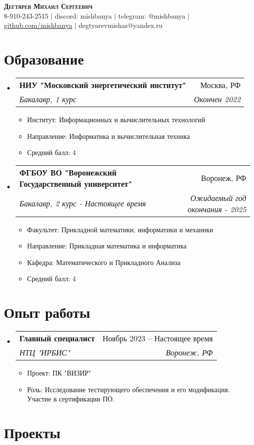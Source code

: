 \documentclass[letterpaper,11pt]{article}
\makeatletter
\newcommand{\resumeItem}[1]{
  \item\small{
    {#1 \vspace{-2pt}}
  }
}
\newcommand{\resumeSubheading}[4]{
  \vspace{-2pt}\item
    \begin{tabular*}{0.97\textwidth}[t]{l@{\extracolsep{\fill}}r}
      \textbf{#1} & #2 \\
      \textit{\small#3} & \textit{\small #4} \\
    \end{tabular*}\vspace{-7pt}
}
\newcommand{\resumeSubHeadingListStart}{\begin{itemize}[leftmargin=0.15in, label={}]}
\newcommand{\resumeSubHeadingListEnd}{\end{itemize}}
\newcommand{\resumeItemListStart}{\begin{itemize}}
\newcommand{\resumeItemListEnd}{\end{itemize}\vspace{-5pt}}
\makeatother
\begin{document}


\begin{center}
    \textbf{\Huge \scshape Дегтярев Михаил Сергеевич} \\ \vspace{1pt}
    \small 8-910-243-2515 $|$ {discord: mishbanya} $|$ 
    {telegram: @mishbanya} $|$
    \href{https://github.com/mishbanya}{\underline{github.com/mishbanya}} $|$
    {{degtyarevmishas@yandex.ru}}
\end{center}


\section{Образование}
  \resumeSubHeadingListStart
    \resumeSubheading
      {НИУ "Московский энергетический институт"}{Москва, РФ}
      {Бакалавр, 1 курс}{Окончен 2022}
          \resumeItemListStart
          \resumeItem{Институт: Информационных и вычислительных технологий}
            \resumeItem{Направление: Информатика и вычислительная техника}
            \resumeItem{Средний балл: 4}
        \resumeItemListEnd
    \resumeSubheading
      {ФГБОУ ВО "Воронежский Государственный университет"}{Воронеж, РФ}
      {Бакалавр, 2 курс - Настоящее время}{Ожидаемый год окончания - 2025}
          \resumeItemListStart
              \resumeItem{Факультет: Прикладной математики, информатики и механики}
            \resumeItem{Направление: Прикладная математика и информатика}
            \resumeItem{Кафедра: Математического и Прикладного Анализа}
            \resumeItem{Средний балл: 4}
            
        \resumeItemListEnd

  \resumeSubHeadingListEnd

\section{Опыт работы}
  \resumeSubHeadingListStart

    \resumeSubheading
      {Главный специалист}{Ноябрь 2023 – Настоящее время}
      {НТЦ "ИРБИС"}{Воронеж, РФ}
      \resumeItemListStart
      \resumeItem{Проект: ПК "ВИЗИР"}
        \resumeItem{Роль: Исследование тестирующего обеспечения и его модификация. Участие в сертификации ПО.}
      \resumeItemListEnd
     
    \resumeSubHeadingListEnd

\section{Проекты}
\end{document}
